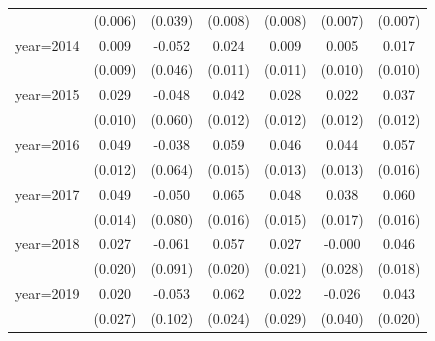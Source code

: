 \begin{table}[htbp]
\begin{tabular}{l*{6}{c}}
                    &     (0.006)         &     (0.039)         &     (0.008)         &     (0.008)         &     (0.007)         &     (0.007)         \\
\addlinespace
year=2014           &       0.009         &      -0.052         &       0.024\sym{**} &       0.009         &       0.005         &       0.017         \\
                    &     (0.009)         &     (0.046)         &     (0.011)         &     (0.011)         &     (0.010)         &     (0.010)         \\
\addlinespace
year=2015           &       0.029\sym{***}&      -0.048         &       0.042\sym{***}&       0.028\sym{**} &       0.022\sym{*}  &       0.037\sym{***}\\
                    &     (0.010)         &     (0.060)         &     (0.012)         &     (0.012)         &     (0.012)         &     (0.012)         \\
\addlinespace
year=2016           &       0.049\sym{***}&      -0.038         &       0.059\sym{***}&       0.046\sym{***}&       0.044\sym{***}&       0.057\sym{***}\\
                    &     (0.012)         &     (0.064)         &     (0.015)         &     (0.013)         &     (0.013)         &     (0.016)         \\
\addlinespace
year=2017           &       0.049\sym{***}&      -0.050         &       0.065\sym{***}&       0.048\sym{***}&       0.038\sym{**} &       0.060\sym{***}\\
                    &     (0.014)         &     (0.080)         &     (0.016)         &     (0.015)         &     (0.017)         &     (0.016)         \\
\addlinespace
year=2018           &       0.027         &      -0.061         &       0.057\sym{***}&       0.027         &      -0.000         &       0.046\sym{**} \\
                    &     (0.020)         &     (0.091)         &     (0.020)         &     (0.021)         &     (0.028)         &     (0.018)         \\
\addlinespace
year=2019           &       0.020         &      -0.053         &       0.062\sym{**} &       0.022         &      -0.026         &       0.043\sym{**} \\
                    &     (0.027)         &     (0.102)         &     (0.024)         &     (0.029)         &     (0.040)         &     (0.020)         \\

\end{tabular}
\end{table}
